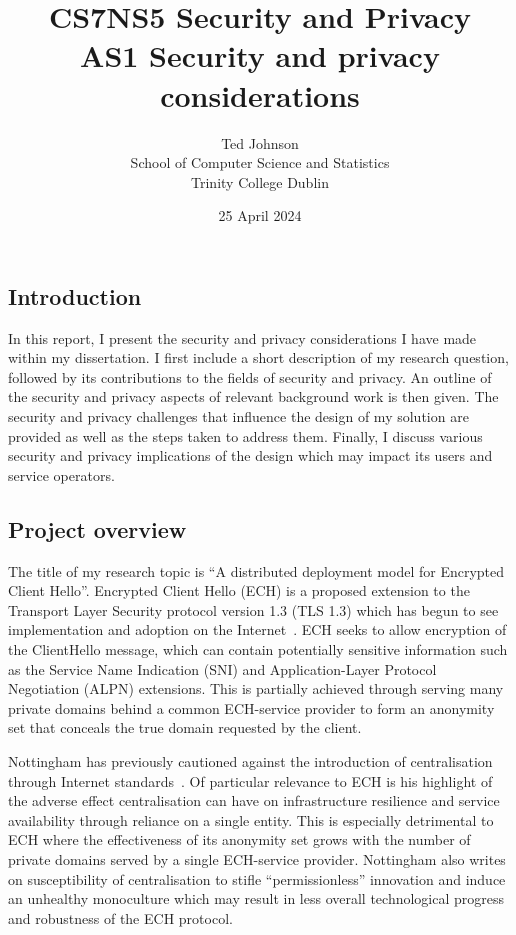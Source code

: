 \documentclass[a4paper,oneside,12pt]{article}
\title{CS7NS5 Security and Privacy\\AS1 Security and privacy considerations}
\author{Ted Johnson\\School of Computer Science and Statistics\\Trinity College Dublin}
\date{25 April 2024}
\begin{document}
\maketitle
\onehalfspacing

\subsection*{Introduction}

In this report, I present the security and privacy considerations I have made within my dissertation. I first include a short description of my research question, followed by its contributions to the fields of security and privacy. An outline of the security and privacy aspects of relevant background work is then given. The security and privacy challenges that influence the design of my solution are provided as well as the steps taken to address them. Finally, I discuss various security and privacy implications of the design which may impact its users and service operators.

\subsection*{Project overview}

The title of my research topic is ``A distributed deployment model for Encrypted Client Hello''. Encrypted Client Hello (ECH) is a proposed extension to the Transport Layer Security protocol version 1.3 (TLS 1.3) which has begun to see implementation and adoption on the Internet~\cite{ietf-tls-esni-18, tsiatsikas2022measuring, CF-ECH}. ECH seeks to allow encryption of the ClientHello message, which can contain potentially sensitive information such as the Service Name Indication (SNI) and Application-Layer Protocol Negotiation (ALPN) extensions. This is partially achieved through serving many private domains behind a common ECH-service provider to form an anonymity set that conceals the true domain requested by the client.

Nottingham has previously cautioned against the introduction of centralisation through Internet standards~\cite{rfc9518}. Of particular relevance to ECH is his highlight of the adverse effect centralisation can have on infrastructure resilience and service availability through reliance on a single entity. This is especially detrimental to ECH where the effectiveness of its anonymity set grows with the number of private domains served by a single ECH-service provider. Nottingham also writes on susceptibility of centralisation to stifle ``permissionless'' innovation and induce an unhealthy monoculture which may result in less overall technological progress and robustness of the ECH protocol.
\end{document}
